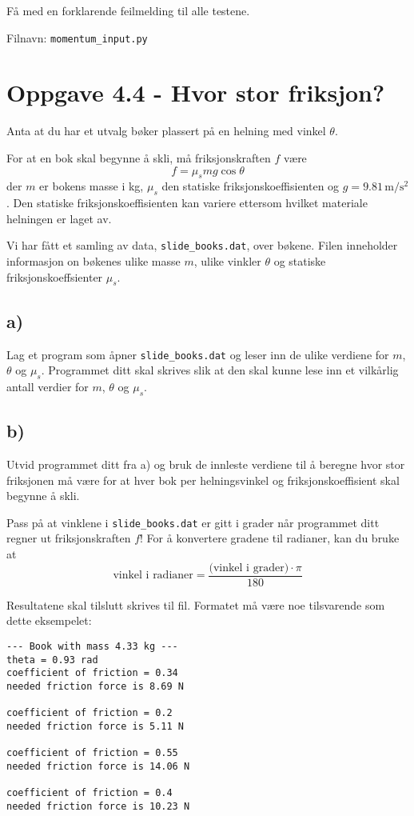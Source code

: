 \documentclass[10pt,a4paper]{article}
\begin{document}
Få med en forklarende feilmelding til alle testene.
 
Filnavn: \texttt{momentum\_input.py}
 
 
 
\section*{Oppgave 4.4 - Hvor stor friksjon?}
Anta at du har et utvalg bøker plassert på en helning med vinkel $\theta$.
 
For at en bok skal begynne å skli, må friksjonskraften $f$ være
\[
f = \mu_smg\cos\theta
\]
der $m$ er bokens masse i kg, $\mu_s$ den statiske friksjonskoeffisienten og $g = 9.81\,\mathrm{m/s^2}$. 
Den statiske friksjonskoeffisienten kan variere ettersom hvilket materiale helningen er laget av. 
 
Vi har fått et samling av data, \texttt{slide\_books.dat}, over bøkene. Filen inneholder informasjon on bøkenes ulike masse $m$, ulike vinkler $\theta$ og statiske friksjonskoeffsienter $\mu_s$. 
 
\subsection*{a)}
Lag et program som åpner \texttt{slide\_books.dat} og leser inn de ulike verdiene for $m$,$\theta$ og $\mu_s$. Programmet ditt skal skrives slik at den skal kunne lese inn et vilkårlig antall verdier for $m$, $\theta$ og $\mu_s$. 
 
\subsection*{b)}
Utvid programmet ditt fra a) og bruk de innleste verdiene til å beregne hvor stor friksjonen må være for at hver bok per helningsvinkel og friksjonskoeffisient skal begynne å skli. 
 
Pass på at vinklene i \texttt{slide\_books.dat} er gitt i grader når programmet ditt regner ut friksjonskraften $f$! For å konvertere gradene til radianer, kan du bruke at 
\[
\text{vinkel i radianer} = \frac{\text{(vinkel i grader)} \cdot \pi}{180}
\]
 
Resultatene skal tilslutt skrives til fil. Formatet må være noe tilsvarende som dette eksempelet:
\begin{verbatim}
--- Book with mass 4.33 kg ---
theta = 0.93 rad
coefficient of friction = 0.34
needed friction force is 8.69 N
 
coefficient of friction = 0.2
needed friction force is 5.11 N
 
coefficient of friction = 0.55
needed friction force is 14.06 N
 
coefficient of friction = 0.4
needed friction force is 10.23 N
\end{verbatim}
 
\end{document}
